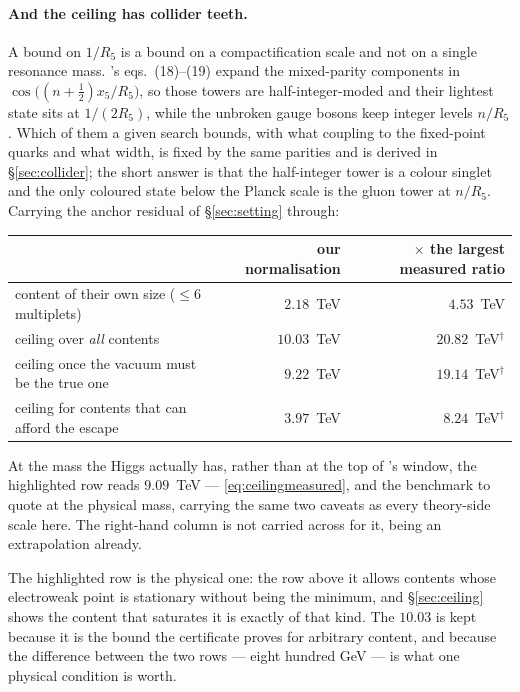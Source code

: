 \documentclass[11pt,a4paper]{article}
\begin{document}
\paragraph{And the ceiling has collider teeth.} A bound
on $1/R_5$ is a bound on a compactification scale and not on a single resonance mass.
\cite{KM25}'s eqs.~(18)--(19) expand the mixed-parity components in
$\cos\bigl((n+\tfrac12)x_5/R_5\bigr)$, so those towers are half-integer-moded and their lightest
state sits at $1/(2R_5)$, while the unbroken gauge bosons keep integer levels $n/R_5$. Which of
them a given search bounds, with what coupling to the fixed-point quarks and what width, is fixed
by the same parities and is derived in \S\ref{sec:collider}; the short answer is that the
half-integer tower is a colour singlet and the only coloured state below the Planck scale is the
gluon tower at $n/R_5$. Carrying the anchor residual of
\S\ref{sec:setting} through:

\begin{center}\small
{}
\begin{tabular}{lrr}
\toprule
\rowcolor{hdrblue!10} & our normalisation & $\times$ the largest measured ratio\\
\midrule
content of their own size ($\le6$ multiplets) & $2.18$~TeV & $4.53$~TeV\\
ceiling over \emph{all} contents & $10.03$~TeV & $20.82$~TeV$^{\dagger}$\\
\rowcolor{amber!14}ceiling once the vacuum must be the true one & $9.22$~TeV & $19.14$~TeV$^{\dagger}$\\
ceiling for contents that can afford the escape & $3.97$~TeV & $8.24$~TeV$^{\dagger}$\\
\bottomrule
\end{tabular}
\end{center}

\noindent At the mass the Higgs actually has, rather than at the top of \cite{KM25}'s window, the
highlighted row reads $9.09$~TeV --- \eqref{eq:ceilingmeasured}, and the benchmark to quote at the
physical mass, carrying the same two caveats as every theory-side scale here. The right-hand column is not carried across for it, being an
extrapolation already.

\noindent The highlighted row is the physical one: the row above it allows contents whose
electroweak point is stationary without being the minimum, and \S\ref{sec:ceiling} shows the
content that saturates it is exactly of that kind. The $10.03$ is kept because it is the bound the
certificate proves for arbitrary content, and because the difference between the two rows --- eight
hundred GeV --- is what one physical condition is worth.
\end{document}
